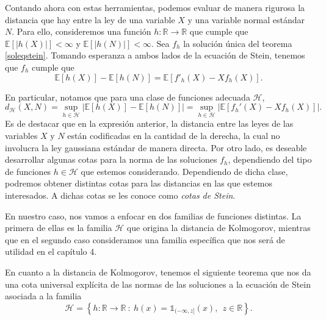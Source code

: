 \documentclass[letterpaper,twoside,12pt]{book}
\newcommand{\R}{\mathbb{R}}
\newcommand{\E}{\mathbb{E}}
\newcommand{\1}{\mathds{1}}
\newcommand{\abs}[1]{\left\lvert #1 \right\rvert}
\renewcommand{\to}{\rightarrow}
\theoremstyle{definition}
\theoremstyle{definition}
\theoremstyle{remark}
\theoremstyle{definition}
\theoremstyle{definition}
\theoremstyle{definition}
\theoremstyle{definition}
\theoremstyle{definition}
\begin{document}
 Contando ahora con estas herramientas, podemos evaluar de manera rigurosa la distancia que hay entre la ley de una variable $X$ y una variable normal estándar $N$. Para ello, consideremos una función $h:\R\to\R$ que cumple que $\E\left[\abs{h(X)}\right]<\infty$ y $\E\left[\abs{h(N)}\right]<\infty$. Sea $f_h$ la solución única del teorema \ref{soleqstein}. Tomando esperanza a ambos lados de la ecuación de Stein, tenemos que $f_h$ cumple que 
\begin{equation}\label{eqmetodostein}
   \E\left[h(X)\right]-\E\left[h(N)\right]=\E\left[f'_h(X)-Xf_h(X)\right].
 \end{equation}
 
 En particular, notamos que para una clase de funciones adecuada $\mathscr{H}$, 
  \begin{equation*}
   d_\mathscr{H}(X,N)=\sup_{h\in \mathscr{H}}\abs{\E\left[h(X)\right]-\E\left[h(N)\right]}=\sup_{h\in \mathscr{H}}\abs{\E\left[f_h'(X)-Xf_h(X)\right]}.
   \end{equation*}
 Es de destacar que en la expresión anterior, la distancia entre las leyes de las variables $X$ y $N$ están codificadas en la cantidad de la derecha, la cual no involucra la ley gaussiana estándar de manera directa. Por otro lado, es deseable desarrollar algunas cotas para la norma de las soluciones $f_h$, dependiendo del tipo de funciones $h\in\mathscr{H}$ que estemos considerando. Dependiendo de dicha clase, podremos obtener distintas cotas para las distancias en las que estemos interesados. A dichas cotas se les conoce como \textit{cotas de Stein}.
 
 En nuestro caso, nos vamos a enfocar en dos familias de funciones distintas. La primera de ellas es la familia $\mathscr{H}$ que origina la distancia de Kolmogorov, mientras que en el segundo caso consideramos una familia específica que nos será de utilidad en el capítulo 4.
 
En cuanto a la distancia de Kolmogorov, tenemos el siguiente teorema que nos da una cota universal explícita de las normas de las soluciones a la ecuación de Stein asociada a la familia 
\[
\mathscr{H}= \left\{h:\R\to \R \ :\ h(x)=\1_{(-\infty,z]}(x),\ \  z\in \R\right\}.
\]
  
\end{document}
